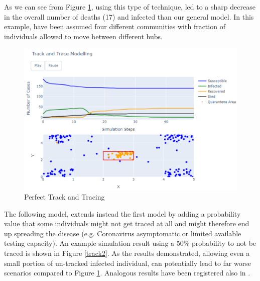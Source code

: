As we can see from Figure \ref{track1}, using this type of technique, led to a sharp decrease in the overall number of deaths (17) and infected than our general model. In this example, have been assumed four different communities with fraction of individuals allowed to move between different hubs. 
\begin{figure}[ht!]%
    \centering
    \includegraphics[width=0.85\linewidth]{latex/images/track1.pdf}
    \vspace{-0.3cm}
    \caption{Perfect Track and Tracing}
    \label{track1}
\end{figure}
\vspace{-0.3cm}

The following model, extends instead the first model by adding a probability value that some individuals might not get traced at all and might therefore end up spreading the disease (e.g. Coronavirus asymptomatic or limited available testing capacity). An example simulation result using a 50\% probability to not be traced is shown in Figure \ref{track2}. As the results demonstrated, allowing even a small portion of un-tracked infected individual, can potentially lead to far worse scenarios compared to Figure \ref{track1}. Analogous results have been registered also in \cite{epic}.

